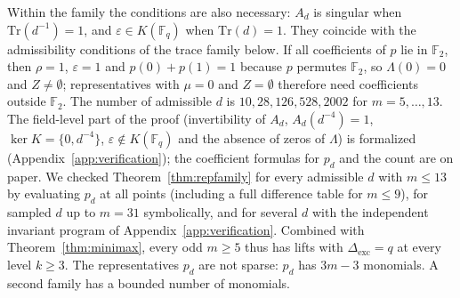 \documentclass[11pt]{article}
\theoremstyle{definition}
\theoremstyle{remark}
\newcommand{\F}{\mathbb{F}}
\newcommand{\Tr}{\mathrm{Tr}}
\newcommand{\Dexc}{\Delta_{\mathrm{exc}}}
\begin{document}
Within the family the conditions are also necessary: $A_d$ is singular when $\Tr(d^{-1})=1$, and
$\varepsilon\in K(\F_q)$ when $\Tr(d)=1$. They coincide with the admissibility conditions of the trace family below.
If all coefficients of $p$ lie in $\F_2$, then $\rho=1$, $\varepsilon=1$ and $p(0)+p(1)=1$ because $p$ permutes
$\F_2$, so $\Lambda(0)=0$ and $Z\ne\emptyset$; representatives with $\mu=0$ and $Z=\emptyset$ therefore need coefficients
outside $\F_2$. The number of admissible $d$ is $10,28,126,528,2002$ for $m=5,\dots,13$. The field-level part of the proof (invertibility of $A_d$,
$A_d(d^{-4})=1$, $\ker K=\{0,d^{-4}\}$, $\varepsilon\notin K(\F_q)$ and the absence of zeros of $\Lambda$) is formalized
(Appendix~\ref{app:verification}); the coefficient formulas for $p_d$ and the count are on paper. We checked
Theorem~\ref{thm:repfamily} for every admissible $d$ with $m\le13$ by evaluating $p_d$ at all points (including a full
difference table for $m\le9$), for sampled $d$ up to $m=31$ symbolically, and for several $d$ with the independent
invariant program of Appendix~\ref{app:verification}. Combined with Theorem~\ref{thm:minimax}, every odd $m\ge5$ thus
has lifts with $\Dexc=q$ at every level $k\ge3$. The representatives $p_d$ are not sparse: $p_d$ has $3m-3$
monomials. A second family has a bounded number of monomials.
\end{document}
